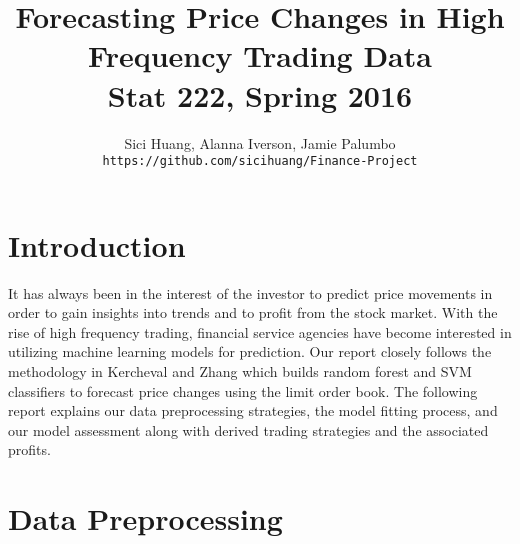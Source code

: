 \documentclass[11pt]{article}
\title{Forecasting Price Changes in High Frequency Trading Data\\
  Stat 222, Spring 2016}
\author{
  Sici Huang, Alanna Iverson, Jamie Palumbo\\
  \texttt{https://github.com/sicihuang/Finance-Project}
}
\begin{document}
\maketitle

\section{Introduction}

It has always been in the interest of the investor to predict price movements in order to gain insights into trends and to profit from the stock market. With the rise of high frequency trading, financial service agencies have become interested in utilizing machine learning models for prediction. Our report closely follows the methodology in Kercheval and Zhang \cite{ky} which builds random forest and SVM classifiers to forecast price changes using the limit order book. The following report explains our data preprocessing strategies, the model fitting process, and our model assessment along with derived trading strategies and the associated profits. 



\section{Data Preprocessing}
\end{document}
